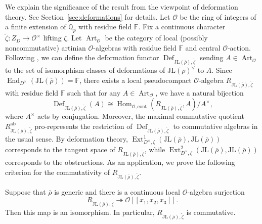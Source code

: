 \documentclass[11pt,a4paper]{article} %
\def\FF{\mathbb{F}}
\def\cO{\mathcal{O}}
\def\Art{\operatorname{Art}}
\def\End{\operatorname{End}}
\def\Ext{\operatorname{Ext}} %
\def\Hom{\operatorname{Hom}}
\def\Qp{\mathbb{Q}_p}
\def\rhobar{\overline{\rho}}
\begin{document}
We explain the significance of the result from the viewpoint of deformation theory. See Section~\ref{sec:deformations} for details. Let $\cO$ be the ring of integers of a finite extension of $\Qp$ with residue field $\FF$. Fix a continuous character $\widetilde\zeta:Z_D\to\cO^\times$ lifting $\zeta$. Let $\Art_{\cO}$ be the category of local (possibly noncommutative) artinian $\cO$-algebras with residue field $\FF$ and central $\cO$-action. Following \cite{Pas13}, we can define the deformation functor $\operatorname{Def}_{\mathrm{JL}(\rhobar),\widetilde\zeta}$ sending $A\in\Art_{\cO}$ to the set of isomorphism classes of deformations of $\mathrm{JL}(\rhobar)^\vee$ to $A$. Since $\End_{D^\times}\left(\mathrm{JL}(\rhobar)\right)=\FF$, there exists a local pseudocompact $\cO$-algebra $R_{\mathrm{JL}(\rhobar),\widetilde\zeta}$ with residue field $\FF$ such that for any $A\in\Art_{\cO}$, we have a natural bijection
\[
\operatorname{Def}_{\mathrm{JL}(\rhobar),\widetilde\zeta}(A)
\cong
\Hom_{\cO,\mathrm{cont}}(R_{\mathrm{JL}(\rhobar),\widetilde\zeta},A)/A^\times,
\]
where $A^\times$ acts by conjugation. Moreover, the maximal commutative quotient $R_{\mathrm{JL}(\rhobar),\widetilde\zeta}^{\mathrm{ab}}$
pro-represents the restriction of $\operatorname{Def}_{\mathrm{JL}(\rhobar),\widetilde\zeta}$ to commutative algebras in the usual sense. By deformation theory, $\Ext^1_{D^\times,\zeta}\left(\mathrm{JL}(\rhobar),\mathrm{JL}(\rhobar)\right)$ corresponds to the tangent space of $R_{\mathrm{JL}(\rhobar),\widetilde\zeta}$, while $\Ext^2_{D^\times,\zeta}\left(\mathrm{JL}(\rhobar),\mathrm{JL}(\rhobar)\right)$ corresponds to the obstructions. As an application, we prove the following criterion for the commutativity of $R_{\mathrm{JL}(\rhobar),\widetilde\zeta}$.

\begin{theorem}
    Suppose that $\rhobar$ is generic and there is a continuous local $\cO$-algebra surjection
    \[
    R_{\mathrm{JL}(\rhobar),\widetilde\zeta}\twoheadrightarrow
    \cO[[x_1,x_2,x_3]].
    \]
    Then this map is an isomorphism. In particular, $R_{\mathrm{JL}(\rhobar),\widetilde\zeta}$ is commutative.
\end{theorem}
\end{document}
